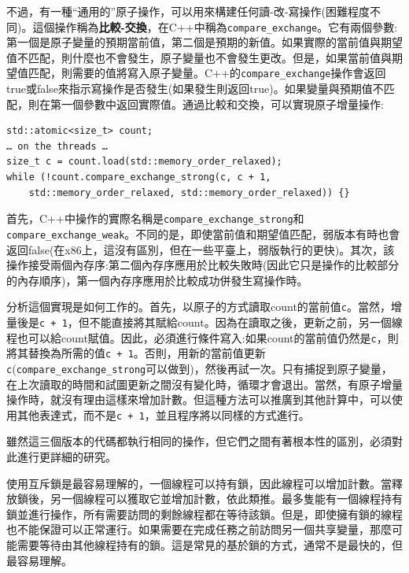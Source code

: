 不過，有一種“通用的”原子操作，可以用來構建任何讀-改-寫操作(困難程度不同)。這個操作稱為\textbf{比較-交換}，在C++中稱為\texttt{compare\_exchange}。它有兩個參數:第一個是原子變量的預期當前值，第二個是預期的新值。如果實際的當前值與期望值不匹配，則什麼也不會發生，原子變量也不會發生更改。但是，如果當前值與期望值匹配，則需要的值將寫入原子變量。C++的\texttt{compare\_exchange}操作會返回true或false來指示寫操作是否發生(如果發生則返回true)。如果變量與預期值不匹配，則在第一個參數中返回實際值。通過比較和交換，可以實現原子增量操作:

\begin{lstlisting}[style=styleCXX]
std::atomic<size_t> count;
… on the threads …
size_t c = count.load(std::memory_order_relaxed);
while (!count.compare_exchange_strong(c, c + 1,
	std::memory_order_relaxed, std::memory_order_relaxed)) {}
\end{lstlisting}

首先，C++中操作的實際名稱是\texttt{compare\_exchange\_strong}和\texttt{compare\_exchange\_weak}。不同的是，即使當前值和期望值匹配，弱版本有時也會返回false(在x86上，這沒有區別，但在一些平臺上，弱版執行的更快)。其次，該操作接受兩個內存序:第二個內存序應用於比較失敗時(因此它只是操作的比較部分的內存順序)，第一個內存序應用於比較成功併發生寫操作時。

分析這個實現是如何工作的。首先，以原子的方式讀取count的當前值\texttt{c}。當然，增量後是\texttt{c + 1}，但不能直接將其賦給count。因為在讀取之後，更新之前，另一個線程也可以給count賦值。因此，必須進行條件寫入:如果count的當前值仍然是\texttt{c}，則將其替換為所需的值\texttt{c + 1}。否則，用新的當前值更新\texttt{c}(\texttt{compare\_exchange\_strong}可以做到)，然後再試一次。只有捕捉到原子變量，在上次讀取的時間和試圖更新之間沒有變化時，循環才會退出。當然，有原子增量操作時，就沒有理由這樣來增加計數。但這種方法可以推廣到其他計算中，可以使用其他表達式，而不是\texttt{c + 1}，並且程序將以同樣的方式進行。

雖然這三個版本的代碼都執行相同的操作，但它們之間有著根本性的區別，必須對此進行更詳細的研究。


使用互斥鎖是最容易理解的，一個線程可以持有鎖，因此線程可以增加計數。當釋放鎖後，另一個線程可以獲取它並增加計數，依此類推。最多隻能有一個線程持有鎖並進行操作，所有需要訪問的剩餘線程都在等待該鎖。但是，即使擁有鎖的線程也不能保證可以正常運行。如果需要在完成任務之前訪問另一個共享變量，那麼可能需要等待由其他線程持有的鎖。這是常見的基於鎖的方式，通常不是最快的，但最容易理解。

